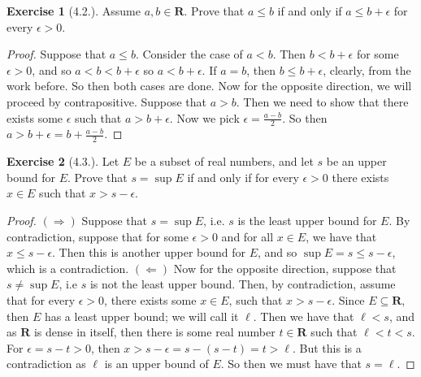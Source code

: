 \documentclass[9pt,reqno]{amsart}
\theoremstyle{definition}
\newtheorem{exercise}{Exercise}[section]
\newcommand{\rr}{\mathbf R}
\begin{document}
\begin{exercise}[4.2.] Assume $a, b \in \rr$. Prove that $a \leq b$ if and only if $a \leq b + \epsilon $ for every $\epsilon>0$. 
\end{exercise}
\begin{proof} Suppose that $a \leq b$. Consider the case of $a < b$. Then $b < b+\epsilon$ for some $\epsilon > 0$, and so $a < b < b+\epsilon$ so $a < b+ \epsilon$. If $a =b$, then $b \leq b + \epsilon$, clearly, from the work before. So then both cases are done. Now for the opposite direction, we will proceed by contrapositive. Suppose that $a >b$. Then we need to show that there exists some $\epsilon$ such that $a > b+\epsilon$. Now we pick $\epsilon = \frac{a-b}{2}$. So then $a>b+ \epsilon = b+ \frac{a-b}{2}$. 
\end{proof}
\begin{exercise}[4.3.] Let $E$ be a subset of real numbers, and let $s$ be an upper bound for $E$. Prove that $s = \sup E$ if and only if for every $\epsilon > 0$ there exists $x \in E$ such that $x > s - \epsilon$.
\end{exercise}
\begin{proof}
	$(\Rightarrow)$ Suppose that $s  = \sup E$, i.e. $s$ is the least upper bound for $E$. By contradiction, suppose that for some $\epsilon > 0$ and for all $x \in E$, we have that $x \leq s-\epsilon$. Then this is another upper bound for $E$, and so $\sup E = s \leq s-\epsilon$, which is a contradiction. $(\Leftarrow)$ Now for the opposite direction, suppose that $s \neq \sup E$, i.e $s$ is not the least upper bound. Then, by contradiction, assume that for every $\epsilon >0$, there exists some $x \in E$, such that $x>s-\epsilon$. Since $E \subseteq \rr$, then $E$ has a least upper bound; we will call it $\ell$. Then we have that $\ell < s$, and as $\rr$ is dense in itself, then there is some real number $t \in \rr$ such that $\ell < t< s$. For $\epsilon = s - t > 0$, then $x>s-\epsilon = s-(s-t) = t> \ell$. But this is a contradiction as $\ell$ is an upper bound of $E$. So then we must have that $s = \ell$.
	\end{proof}
\end{document}

